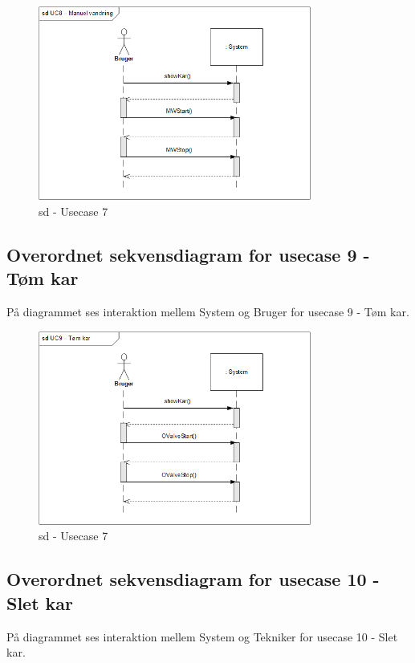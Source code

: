 \begin{figure}[H]
    \centering
    \includegraphics[width=0.8\textwidth]{Systemarkitektur/OverordnedeSekvensdiagrammer/sd_UC8.png}
    \caption{sd - Usecase 7}
    \label{fig:sd_UC6}
\end{figure}

\subsection*{Overordnet sekvensdiagram for usecase 9 - Tøm kar}
På diagrammet ses interaktion mellem System og Bruger for usecase 9 - Tøm kar.

\begin{figure}[H]
    \centering
    \includegraphics[width=0.8\textwidth]{Systemarkitektur/OverordnedeSekvensdiagrammer/sd_UC9.png}
    \caption{sd - Usecase 7}
    \label{fig:sd_UC6}
\end{figure}

\subsection*{Overordnet sekvensdiagram for usecase 10 - Slet kar}
På diagrammet ses interaktion mellem System og Tekniker for usecase 10 - Slet kar.


